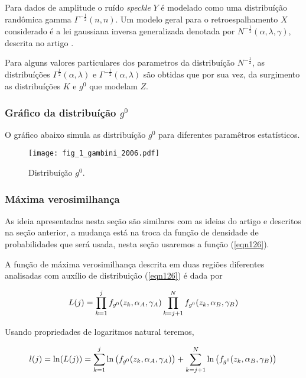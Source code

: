 Para dados de amplitude o ruído {\it speckle} $Y$ é modelado como uma distribuíção randômica gamma $\Gamma^{-\frac{1}{2}}(n,n)$. Um modelo geral para o retroespalhamento $X$ considerado é a lei gaussiana inversa generalizada denotada por $N^{-\frac{1}{2}}(\alpha,\lambda,\gamma)$, descrita no artigo \cite{fmcs}.

Para alguns valores particulares dos parametros da distribuíção $N^{-\frac{1}{2}}$, as distribuíções $\Gamma^{\frac{1}{2}}(\alpha,\lambda)$ e $\Gamma^{-\frac{1}{2}}(\alpha,\lambda)$ são obtidas que por sua vez, da surgimento as distribuíções $K$ e $g^{0}$ que modelam $Z$.

\subsubsection{Gráfico da distribuíção $g^{0}$}

O gráfico abaixo simula as distribuíção $g^{0}$ para diferentes paramêtros estatísticos.

\begin{figure}[hbt]
\centering
\texttt{[image: fig\_1\_gambini\_2006.pdf]}
	\caption{Distribuíção $g^{0}$.}
\label{fig1}
\end{figure}
\subsubsection{Máxima verosimilhança}

As ideia apresentadas nesta seção são similares com as ideias do artigo \cite{nhfc} e descritos na seção anterior, a mudança está na troca da função de densidade de probabilidades que será usada, nesta seção usaremos a função (\ref{eqn126}).

A função de máxima verosimilhança descrita em duas regiões diferentes analisadas com auxílio de distribuição (\ref{eqn126}) é dada por

\begin{equation*}
	L(j)=\prod_{k=1}^{j}f_{g^{0}}(z_{k}, \alpha_{A}, \gamma_{A} ) \prod_{k=j+1}^{N}f_{g^{0}}(z_{k}, \alpha_{B}, \gamma_{B} ) \\
\end{equation*}

Usando propriedades de logaritmos natural teremos,


\begin{equation}\label{eqn127}
	l(j)=\ln(L(j))=\sum_{k=1}^{j}\ln\left(f_{g^{0}}(z_{k}, \alpha_{A}, \gamma_{A} )\right)+ \sum_{k=j+1}^{N}\ln\left(f_{g^{0}}(z_{k}, \alpha_{B}, \gamma_{B} )\right) \\
\end{equation}

